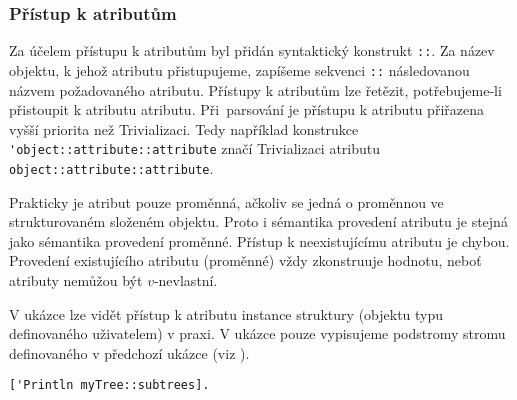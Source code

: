 \subsubsection{Přístup k atributům}

Za účelem přístupu k atributům byl přidán syntaktický konstrukt \lstinline{::}. Za název objektu,
k jehož atributu přistupujeme, zapíšeme sekvenci \lstinline{::} následovanou názvem požadovaného
atributu. Přístupy k atributům lze řetězit, potřebujeme-li přistoupit k atributu atributu.
Při~parsování je přístupu k atributu přiřazena vyšší priorita než Trivializaci. Tedy například
konstrukce \lstinline{'object::attribute::attribute} značí Trivializaci atributu
\lstinline{object::attribute::attribute}.

Prakticky je atribut pouze proměnná, ačkoliv se jedná o proměnnou ve strukturovaném složeném
objektu. Proto i sémantika provedení atributu je stejná jako sémantika provedení proměnné. Přístup
k neexistujícímu atributu je chybou. Provedení existujícího atributu (proměnné) vždy zkonstruuje
hodnotu, neboť atributy nemůžou být $v$-nevlastní.

V ukázce  lze vidět přístup k atributu instance struktury (objektu
typu definovaného uživatelem) v praxi. V ukázce pouze vypisujeme podstromy stromu definovaného
v předchozí ukázce (viz ).

\begin{lstlisting}[caption={Příklad přístupu k atributům objektu},label=struct-attr-access]
['Println myTree::subtrees].
\end{lstlisting}

\endinput

